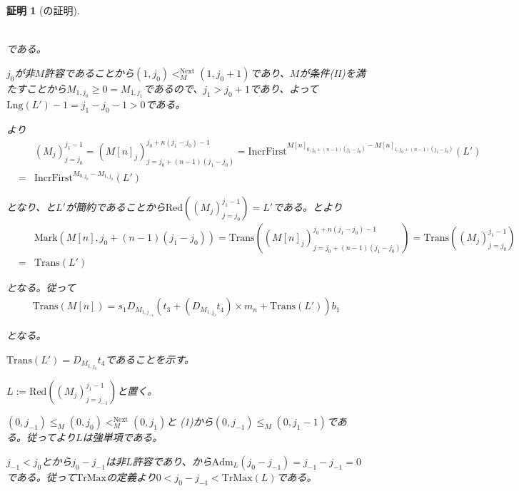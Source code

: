 \documentclass[dvipdfmx,uplatex]{jsarticle}
\theoremstyle{customnonumberbreakfortheorem}
\theoremstyle{customnonumberbreakforproof}
\newtheorem{hideableproof}{証明}
\begin{document}
\begin{hideableproof}[の証明]
\begin{indented}
\begin{indented}
\begin{eqnarray*}
			\end{eqnarray*}
			\item である。
			\item \(j_0\)が非\(M\)許容であることから\((1,j_0) <_M^{\textrm{Next}} (1,j_0+1)\)であり、\(M\)が条件(II)を満たすことから\(M_{1,j_0} \geq 0 = M_{1,j_1}\)であるので、\(j_1 > j_0+1\)であり、よって\(\textrm{Lng}(L')-1 = j_1-j_0-1 > 0\)である。
			\item {}より
			\begin{eqnarray*}
			& & (M_j)_{j=j_0}^{j_1-1} = (M[n]_j)_{j=j_0+(n-1)(j_1-j_0)}^{j_0+n(j_1-j_0)-1} = \textrm{IncrFirst}^{M[n]_{0,j_0+(n-1)(j_1-j_0)}-M[n]_{1,j_0+(n-1)(j_1-j_0)}}(L') \\
			& = & \textrm{IncrFirst}^{M_{0,j_0}-M_{1,j_0}}(L')
			\end{eqnarray*}
			\item となり、と\(L'\)が簡約であることから\(\textrm{Red}((M_j)_{j=j_0}^{j_1-1}) = L'\)である。とより
			\begin{eqnarray*}
			& & \textrm{Mark}(M[n],j_0+(n-1)(j_1-j_0)) = \textrm{Trans}((M[n]_j)_{j=j_0+(n-1)(j_1-j_0)}^{j_0+n(j_1-j_0)-1}) = \textrm{Trans}((M_j)_{j=j_0}^{j_1-1}) \\
			& = & \textrm{Trans}(L')
			\end{eqnarray*}
			\item となる。従って
			\begin{eqnarray*}
			\textrm{Trans}(M[n]) = s_1 D_{M_{1,j_{-1}}}(t_3 + (D_{M_{1,j_0}} t_4) \times m_n + \textrm{Trans}(L')) b_1
			\end{eqnarray*}
			\item となる。
			\item
			\item \(\textrm{Trans}(L') = D_{M_{1,j_0}} t_4\)であることを示す。
			\item \(L := \textrm{Red}((M_j)_{j=j_{-1}}^{j_1-1})\)と置く。
			\item \((0,j_{-1}) \leq_M (0,j_0) <_M^{\textrm{Next}} (0,j_1)\)と (1)から\((0,j_{-1}) \leq_M (0,j_1-1)\)である。従ってより\(L\)は強単項である。
			\item \(j_{-1} < j_0\)とから\(j_0-j_{-1}\)は非\(L\)許容であり、から\(\textrm{Adm}_L(j_0-j_{-1}) = j_{-1}-j_{-1} = 0\)である。従って\(\textrm{TrMax}\)の定義より\(0 < j_0-j_{-1} < \textrm{TrMax}(L)\)である。

\end{indented}
\end{indented}
\end{hideableproof}
\end{document}
